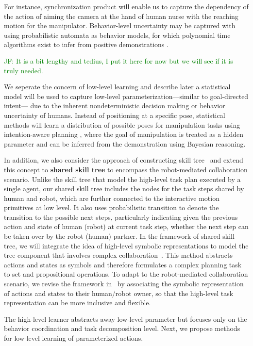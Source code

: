 \documentclass[letterpaper, 11 pt, onecolumn]{article}
\newcommand{\jie}[1]{\textcolor{green}{JF: #1}}
\begin{document}
For instance, synchronization product will enable us to capture the dependency of the action of aiming the camera at the hand of human nurse with the reaching motion for the manipulator. Behavior-level uncertainty 
 may be captured with using probabilistic automata as behavior models, for which polynomial time algorithms exist to infer from positive demonstrations \cite[Chap 12]{de2010grammatical}. 
 
\jie{It is a bit lengthy and tedius, I put it here for now but we will see if it is truly needed.}
 
 We seperate the concern of low-level learning and describe later a statistical model will be used to capture low-level parameterization—similar to goal-directed intent— due to the inherent nondeterministic decision making or behavior uncertainty of humans. Instead of positioning at a specific pose, statistical methods will learn a distribution of possible poses for manipulation tasks using intention-aware planning \cite{bandyopadhyay2013intention}, where the goal of manipulation is treated as a hidden parameter and can be inferred from the demonstration using Bayesian reasoning.

In addition, we also consider the approach of constructing skill tree~\cite{konidaris2012robot} and extend this concept to \textbf{shared skill tree} to encompass the robot-mediated collaboration scenario. Unlike the skill tree that model the high-level task plan executed by a single agent, our shared skill tree includes the nodes for the task steps shared by human and robot, which are further connected to the interactive motion primitives at low level. It also uses probabilistic transition to denote the transition to the possible next steps, particularly indicating given the previous action and state of human (robot) at current task step, whether the next step can be taken over by the robot (human) partner. In the framework of shared skill tree, we will integrate the idea of high-level symbolic representations to model the tree component that involves complex collaboration~\cite{konidaris2018skills}. This method abstracts actions and states as symbols and therefore formulates a complex planning task to set and propositional operations. To adapt to the robot-mediated collaboration scenario, we revise the framework in~\cite{konidaris2018skills} by associating the symbolic representation of actions and states to their human/robot owner, so that the high-level task representation can be more inclusive and flexible. 

The high-level learner abstracts away low-level parameter but focuses only on the behavior coordination and task decomposition level. Next, we propose methods for low-level learning of parameterized actions. 
\end{document}
